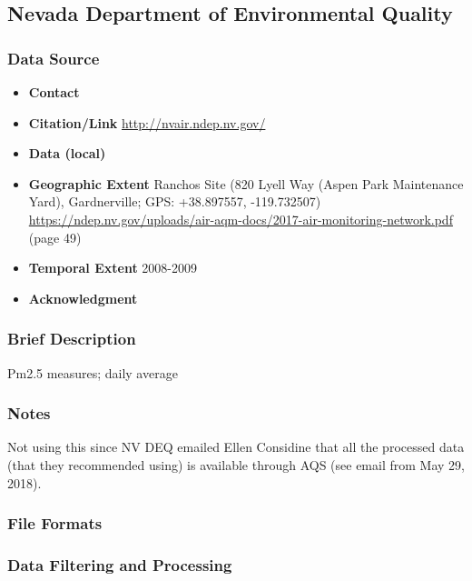 \subsection{Nevada Department of Environmental Quality}

\subsubsection*{Data Source}

\begin{itemize}[nolistsep]
\item \textbf{Contact} 
\item \textbf{Citation/Link} \url{http://nvair.ndep.nv.gov/}
\item \textbf{Data (local)} 
\item \textbf{Geographic Extent} Ranchos Site (820 Lyell Way (Aspen Park Maintenance Yard), Gardnerville; GPS: +38.897557, -119.732507) \url{https://ndep.nv.gov/uploads/air-aqm-docs/2017-air-monitoring-network.pdf } (page 49)
\item \textbf{Temporal Extent} 2008-2009
\item \textbf{Acknowledgment} 
\end{itemize}

\subsubsection*{Brief Description}
Pm2.5 measures; daily average


\subsubsection*{Notes}

Not using this since NV DEQ emailed Ellen Considine that all the processed data (that they recommended using) is available through AQS (see email from May 29, 2018).

\subsubsection*{File Formats} 

\subsubsection*{Data Filtering and Processing}

